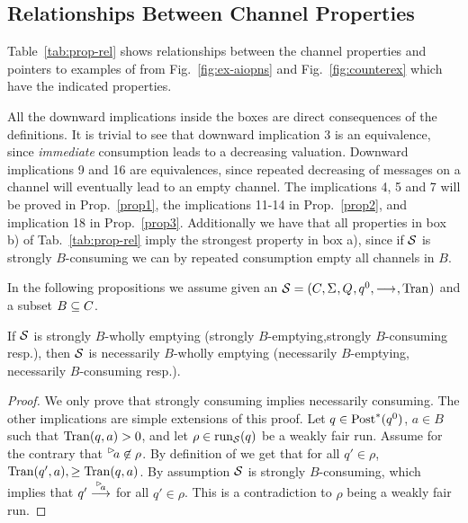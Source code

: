 \subsection{Relationships Between Channel Properties}\label{sec:relations}



Table~\ref{tab:prop-rel} shows relationships between the channel properties and pointers to examples of \AIOPNs from Fig.~\ref{fig:ex-aiopns} and Fig.~\ref{fig:counterex} which have the indicated properties.



All the downward implications inside the boxes are direct consequences of the definitions. It is trivial to see that downward implication 3 is an equivalence, since \emph{immediate} consumption leads to a decreasing valuation. Downward implications 9 and 16 are equivalences, since repeated decreasing of messages on a channel will eventually lead to an empty channel.
The implications 4, 5 and 7 will be proved in Prop.~\ref{prop1}, the implications 11-14 in Prop.~\ref{prop2}, and implication 18 in Prop.~\ref{prop3}.
Additionally we have that all properties in box b) of Tab.~\ref{tab:prop-rel} imply the strongest property in box a), since if $\S$ is strongly $B$-consuming we can by repeated consumption empty all channels in $B$.

In the following propositions we assume given  an \AIOTS $\S = \aiotstup{}$ and a subset $B \subseteq \chan$.

\begin{proposition}\label{prop1}
 If $\S$ is  strongly $B$-wholly emptying (strongly $B$-emptying,\linebreak strongly $B$-consuming resp.), then $\S$ is necessarily $B$-wholly emptying (necessarily $B$-emptying, necessarily $B$-consuming resp.).
\end{proposition}
\begin{proof}
    We only prove that strongly consuming implies necessarily consuming. The other implications are simple extensions of this proof.
 Let $q \in \post^*(q^0)$, $a \in B$ such that $\val(q,a) > 0$, and let $\rho \in \run{\S}(q)$ be a weakly fair run. Assume for the contrary that $\inact{a} \not\in \rho$. By definition of \AIOTS we get that for all $q' \in \rho$, $\val(q',a), \geq \val(q,a)$. By assumption $\S$ is strongly $B$-consuming, which implies that $q' \goes{\inact{a}}$ for all $q' \in \rho$. This is a contradiction to $\rho$ being a weakly fair run. 
\end{proof}

